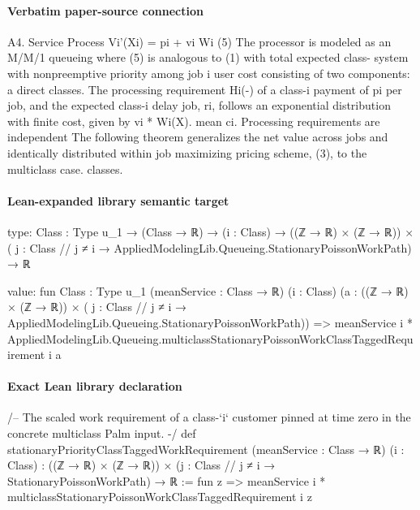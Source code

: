 \documentclass[10pt]{article}
\begin{document}
\paragraph{Verbatim paper-source connection}
\begin{ReviewVerbatim}
A4. Service Process                                                      Vi'(Xi) = pi + vi Wi (5)
The processor is modeled as an M/M/1 queueing                          where (5) is analogous to (1) with total expected class-
system with nonpreemptive priority among job                           i user cost consisting of two components: a direct
classes. The processing requirement Hi(-) of a class-i                 payment of pi per job, and the expected class-i delay
job, ri, follows an exponential distribution with finite cost, given by vi * Wi(X).
mean ci. Processing requirements are independent           The following theorem generalizes the net value
across jobs and identically distributed within job       maximizing pricing scheme, (3), to the multiclass case.
classes.
\end{ReviewVerbatim}



\paragraph{Lean-expanded library semantic target}
\begin{ReviewVerbatim}
type:
{Class : Type u_1} →
  (Class → ℝ) →
    (i : Class) →
      ((ℤ → ℝ) × (ℤ → ℝ)) × ({ j : Class // j ≠ i } → AppliedModelingLib.Queueing.StationaryPoissonWorkPath) → ℝ

value:
fun {Class : Type u_1} (meanService : Class → ℝ) (i : Class)
    (a : ((ℤ → ℝ) × (ℤ → ℝ)) × ({ j : Class // j ≠ i } → AppliedModelingLib.Queueing.StationaryPoissonWorkPath)) =>
  meanService i * AppliedModelingLib.Queueing.multiclassStationaryPoissonWorkClassTaggedRequirement i a
\end{ReviewVerbatim}

\paragraph{Exact Lean library declaration}
\begin{ReviewVerbatim}
/-- The scaled work requirement of a class-`i` customer pinned at time zero
in the concrete multiclass Palm input. -/
def stationaryPriorityClassTaggedWorkRequirement
    (meanService : Class → ℝ) (i : Class) :
    ((ℤ → ℝ) × (ℤ → ℝ)) ×
      ({j : Class // j ≠ i} → StationaryPoissonWorkPath) → ℝ :=
  fun z => meanService i * multiclassStationaryPoissonWorkClassTaggedRequirement i z
\end{ReviewVerbatim}
\end{document}
